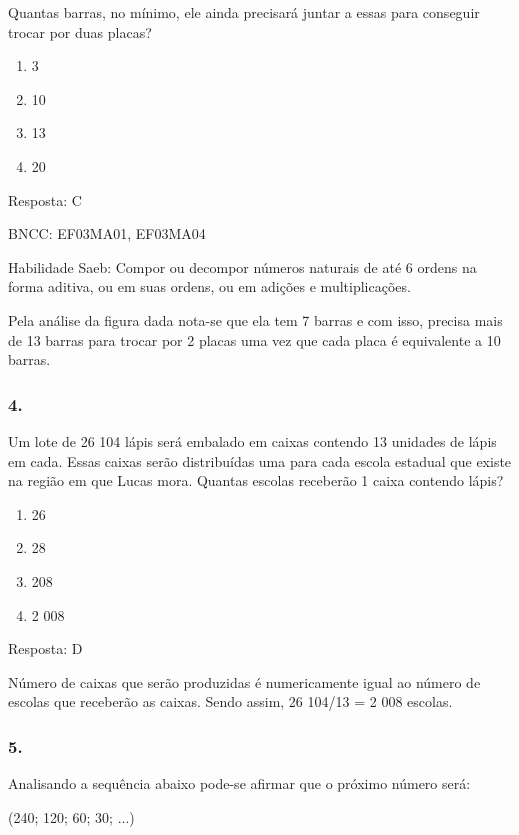 Quantas barras, no mínimo, ele ainda precisará juntar a essas para
conseguir trocar por duas placas?

\begin{enumerate}
\def\labelenumi{\alph{enumi})}
\item
  3
\item
  10
\item
  13
\item
  20
\end{enumerate}

Resposta: C

BNCC: EF03MA01, EF03MA04

Habilidade Saeb: Compor ou decompor números naturais de até 6 ordens na
forma aditiva, ou em suas ordens, ou em adições e multiplicações.

Pela análise da figura dada nota-se que ela tem 7 barras e com isso,
precisa mais de 13 barras para trocar por 2 placas uma vez que cada
placa é equivalente a 10 barras.

\subsubsection{4.}\label{section-144}

Um lote de 26 104 lápis será embalado em caixas contendo 13 unidades de
lápis em cada. Essas caixas serão distribuídas uma para cada escola
estadual que existe na região em que Lucas mora. Quantas escolas
receberão 1 caixa contendo lápis?

\begin{enumerate}
\def\labelenumi{\alph{enumi})}
\item
  26
\item
  28
\item
  208
\item
  2 008
\end{enumerate}

Resposta: D

Número de caixas que serão produzidas é numericamente igual ao número de
escolas que receberão as caixas. Sendo assim, 26 104/13 = 2 008 escolas.

\subsubsection{5.}\label{section-145}

Analisando a sequência abaixo pode-se afirmar que o próximo número será:

(240; 120; 60; 30; ...)

